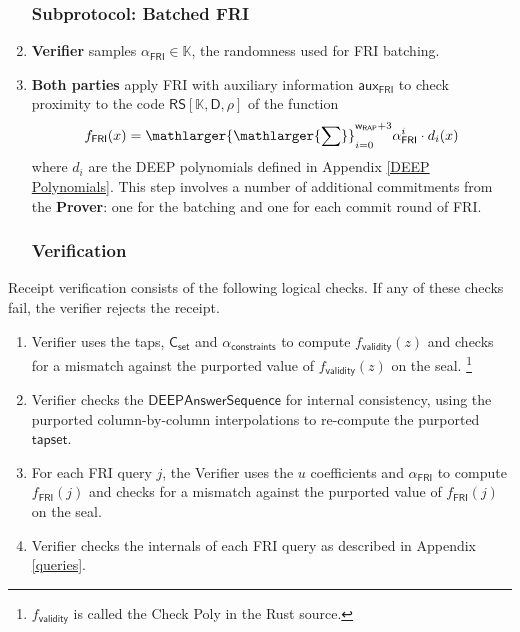 \documentclass[10pt,letterpaper,titlepage]{article}
\theoremstyle{definition}
\begin{document}
\begin{enumerate}
  \subsubsection{Subprotocol: Batched FRI}
  \item \textbf{Verifier} samples $\alpha_\mathsf{FRI}\in\mathbb{K}$, the randomness used for FRI batching.
  \item \textbf{Both parties} apply FRI with auxiliary information $\mathsf{aux}_\mathsf{FRI}$ to check proximity to the code $\mathsf{RS}[\mathbb{K},\mathsf{D},\rho]$ of the function 
    \[
      f_\mathsf{FRI}(x)=
      \mathlarger{
      \mathlarger{\sum}}_{i=0}^{
        \mathsf{w}_\mathsf{RAP}+3
        }
        \alpha_\mathsf{FRI}^i\cdot d_i(x)
    \] 
    where $d_i$ are the DEEP polynomials defined in Appendix \ref{DEEP Polynomials}. 
  This step involves a number of additional commitments from the \textbf{Prover}: one for the batching and one for each commit round of FRI.

  \subsubsection{Verification}
\end{enumerate}
  Receipt verification consists of the following logical checks. If any of these checks fail, the verifier rejects the receipt. \\
    \begin{enumerate}
      \item Verifier uses the taps, $\mathsf{C_{set}}$ and $\alpha_\mathsf{constraints}$ to compute $f_\mathsf{validity}(z)$ and checks for a mismatch against the purported value of $f_\mathsf{validity}(z)$ on the seal.%
      \footnote{$f_\mathsf{validity}$ is called the Check Poly in the Rust source.}
      \item Verifier checks the $\mathsf{DEEPAnswerSequence}$ for internal consistency, using the purported column-by-column interpolations to re-compute the purported $\mathsf{tapset}$. 
      \item For each FRI query $j$, the Verifier uses the $u$ coefficients and $\alpha_\mathsf{FRI}$ to compute $f_\mathsf{FRI}(j)$ and checks for a mismatch against the purported value of $f_\mathsf{FRI}(j)$ on the seal.
      \item Verifier checks the internals of each FRI query as described in Appendix \ref{queries}.
    \end{enumerate}
\end{document}
